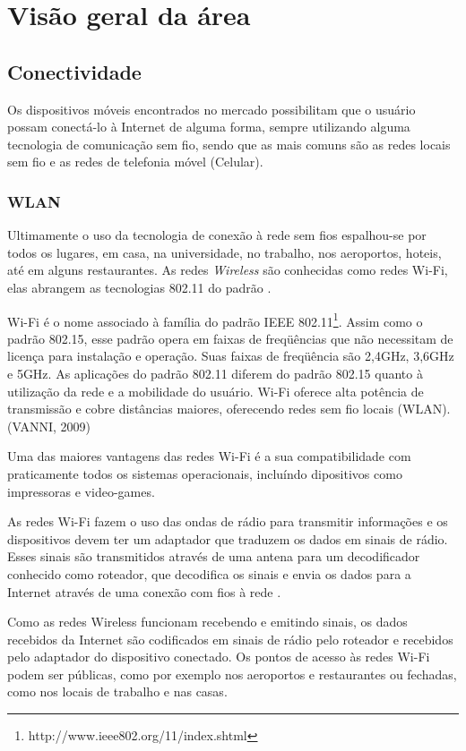 \chapter{Visão geral da área}

\section{Conectividade}
Os dispositivos móveis encontrados no mercado possibilitam que o usuário possam conectá-lo à Internet de alguma forma, sempre utilizando alguma tecnologia de comunicação sem fio, sendo que as mais comuns são as redes locais sem fio  e as redes de telefonia móvel (Celular).
\subsection{WLAN}
Ultimamente o uso da tecnologia de conexão à rede sem fios espalhou-se por todos os lugares, em casa, na universidade, no trabalho, nos aeroportos, hoteis, até em alguns restaurantes.
As redes \textit{Wireless} são conhecidas como redes Wi-Fi, elas abrangem as tecnologias 802.11 do padrão .
\begin{citacao}
Wi-Fi é o nome associado à família do padrão IEEE 802.11\footnote{http://www.ieee802.org/11/index.shtml}. Assim como o
padrão 802.15, esse padrão opera em faixas de freqüências que não necessitam de licença para instalação e operação. Suas faixas de freqüência são 2,4GHz, 3,6GHz e 5GHz. As aplicações do padrão 802.11 diferem do padrão 802.15 quanto à utilização da rede e a mobilidade do usuário. Wi-Fi oferece alta potência de transmissão e cobre distâncias maiores, oferecendo redes sem fio locais (WLAN). (VANNI, 2009)
\end{citacao}
Uma das maiores vantagens das redes Wi-Fi é a sua compatibilidade com praticamente todos os sistemas operacionais, incluíndo dipositivos como impressoras e video-games.

As redes Wi-Fi fazem o uso das ondas de rádio para transmitir informações e os dispositivos devem ter um adaptador que traduzem os dados em sinais de rádio. Esses sinais são transmitidos através de uma antena para um decodificador conhecido como roteador, que decodifica os sinais e envia os dados para a Internet através de uma conexão com fios à rede .

Como as redes Wireless funcionam recebendo e emitindo sinais, os dados recebidos da Internet são codificados em sinais de rádio pelo roteador e recebidos pelo adaptador do dispositivo conectado.
Os pontos de acesso às redes Wi-Fi podem ser públicas, como por exemplo nos aeroportos e restaurantes ou fechadas, como nos locais de trabalho e nas casas.

